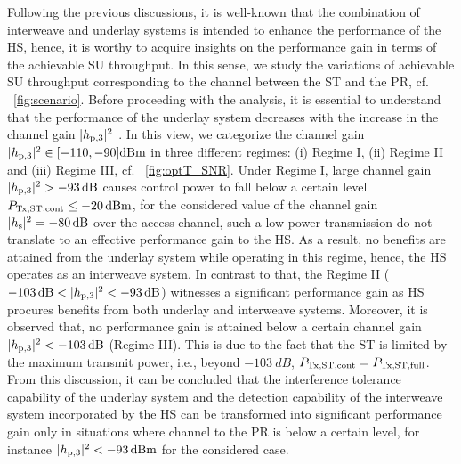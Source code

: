 Following the previous discussions, it is well-known that the combination of interweave and underlay systems is intended to enhance the performance of the HS, hence, it is worthy to acquire insights on the performance gain in terms of the achievable SU throughput. In this sense, we study the variations of achievable SU throughput corresponding to the channel between the ST and the PR, cf. \figurename~\ref{fig:scenario}. Before proceeding with the analysis, it is essential to understand that the performance of the underlay system decreases with the increase in the channel gain $|h_{\text{p,3}}|^2$ \cite{Kaushik16_CL}. In this view, we categorize the channel gain $|h_{\text{p,3}}|^2 \in [-110, -90] \SI{}{dBm}$ in three different regimes: (i) Regime I, (ii) Regime II and (iii) Regime III, cf. \figurename~\ref{fig:optT_SNR}. Under Regime I, large channel gain $|h_{\text{p,3}}|^2 > -\SI{93}{dB}$ causes control power to fall below a certain level $P_{\text{Tx,ST,cont}} \le \SI{-20}{dBm}$, for the considered value of the channel gain $|h_{\text{s}}|^2 = \SI{-80}{dB}$ over the access channel, such a low power transmission do not translate to an effective performance gain to the HS. As a result, no benefits are attained from the underlay system while operating in this regime, hence, the HS operates as an interweave system. In contrast to that, the Regime II ($-\SI{103}{dB} < |h_{\text{p,3}}|^2 < -\SI{93}{dB}$) witnesses a significant performance gain as HS procures benefits from both underlay and interweave systems. Moreover, it is observed that, no performance gain is attained below a certain channel gain $|h_{\text{p,3}}|^2 < \SI{-103}{dB}$ (Regime III). This is due to the fact that the ST is limited by the maximum transmit power, i.e., beyond $\SI{-103}{dB}$, $P_{\text{Tx,ST,cont}} = P_{\text{Tx,ST,full}}$. From this discussion, it can be concluded that the interference tolerance capability of the underlay system and the detection capability of the interweave system incorporated by the HS can be transformed into significant performance gain only in situations where channel to the PR is below a certain level, for instance $|h_{\text{p,3}}|^2 < -\SI{93}{dBm}$ for the considered case.   

